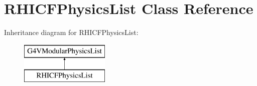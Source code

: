 \hypertarget{class_r_h_i_c_f_physics_list}{}\section{R\+H\+I\+C\+F\+Physics\+List Class Reference}
\label{class_r_h_i_c_f_physics_list}
Inheritance diagram for R\+H\+I\+C\+F\+Physics\+List\+:\begin{figure}[H]
\begin{center}
\leavevmode
\includegraphics[height=2.000000cm]{class_r_h_i_c_f_physics_list}
\end{center}
\end{figure}
